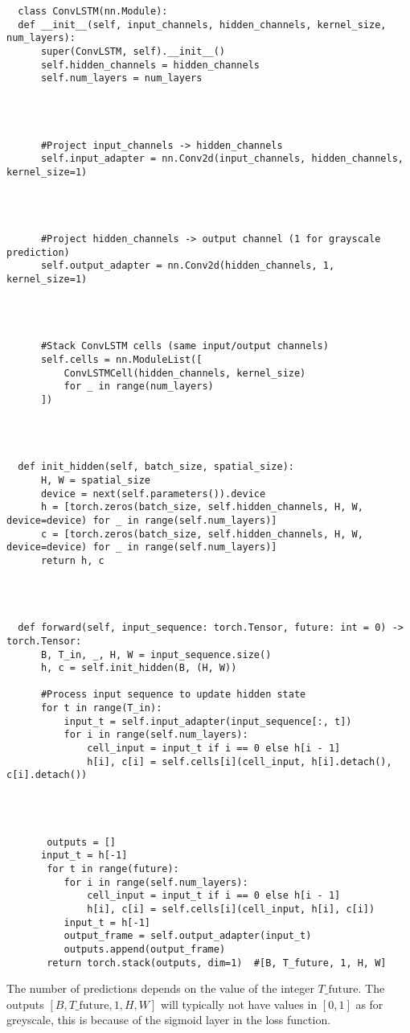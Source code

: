 \documentclass[a4paper,12pt]{article}
\begin{document}
\begin{lstlisting}
  class ConvLSTM(nn.Module):
  def __init__(self, input_channels, hidden_channels, kernel_size, num_layers):
      super(ConvLSTM, self).__init__()
      self.hidden_channels = hidden_channels
      self.num_layers = num_layers




      #Project input_channels -> hidden_channels
      self.input_adapter = nn.Conv2d(input_channels, hidden_channels, kernel_size=1)




      #Project hidden_channels -> output channel (1 for grayscale prediction)
      self.output_adapter = nn.Conv2d(hidden_channels, 1, kernel_size=1)




      #Stack ConvLSTM cells (same input/output channels)
      self.cells = nn.ModuleList([
          ConvLSTMCell(hidden_channels, kernel_size)
          for _ in range(num_layers)
      ])




  def init_hidden(self, batch_size, spatial_size):
      H, W = spatial_size
      device = next(self.parameters()).device
      h = [torch.zeros(batch_size, self.hidden_channels, H, W, device=device) for _ in range(self.num_layers)]
      c = [torch.zeros(batch_size, self.hidden_channels, H, W, device=device) for _ in range(self.num_layers)]
      return h, c




  def forward(self, input_sequence: torch.Tensor, future: int = 0) -> torch.Tensor:
      B, T_in, _, H, W = input_sequence.size()
      h, c = self.init_hidden(B, (H, W))
    
      #Process input sequence to update hidden state
      for t in range(T_in):
          input_t = self.input_adapter(input_sequence[:, t])
          for i in range(self.num_layers):
              cell_input = input_t if i == 0 else h[i - 1]
              h[i], c[i] = self.cells[i](cell_input, h[i].detach(), c[i].detach())




       outputs = []
      input_t = h[-1]
       for t in range(future):
          for i in range(self.num_layers):
              cell_input = input_t if i == 0 else h[i - 1]
              h[i], c[i] = self.cells[i](cell_input, h[i], c[i])
          input_t = h[-1]
          output_frame = self.output_adapter(input_t)
          outputs.append(output_frame)
       return torch.stack(outputs, dim=1)  #[B, T_future, 1, H, W]
\end{lstlisting}
The number of predictions depends on the value of the integer $T\_\text{future}$. The outputs $[B, T\_\text{future}, 1, H, W]$ will typically not have values in $[0,1]$ as for greyscale, this is because of the sigmoid layer in the loss function.
\end{document}
